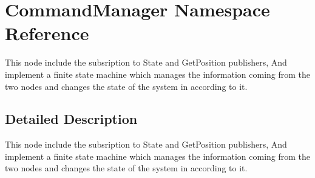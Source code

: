 \hypertarget{namespaceCommandManager}{}\section{Command\+Manager Namespace Reference}
\label{namespaceCommandManager}


This node include the subsription to State and Get\+Position publishers, And implement a finite state machine which manages the information coming from the two nodes and changes the state of the system in according to it.  




\subsection{Detailed Description}
This node include the subsription to State and Get\+Position publishers, And implement a finite state machine which manages the information coming from the two nodes and changes the state of the system in according to it. 

